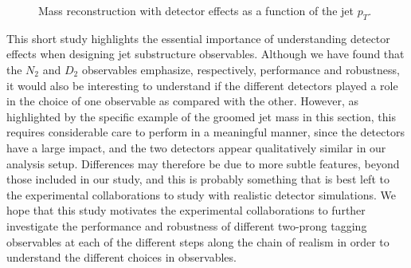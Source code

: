 \documentclass[11pt,letterpaper]{article}
\begin{document}
\begin{figure}
  \caption{Mass reconstruction with detector effects as a function of the jet $p_T$.}
  \label{fig:mass-detector}
\end{figure}




This short study highlights the essential importance of understanding detector effects when designing jet substructure observables. Although we have found that the $N_2$ and $D_2$ observables emphasize, respectively, performance and robustness, it would also be interesting to understand if the different detectors played a role in the choice of one observable as compared with the other. However, as highlighted by the specific example of the groomed jet mass in this section, this requires considerable care to perform in a meaningful manner, since the detectors have a large impact, and the two detectors appear qualitatively similar in our analysis setup. Differences may therefore be due to more subtle features, beyond those included in our study, and this is probably something that is best left to the experimental collaborations to study with realistic detector simulations. We hope that this study motivates the experimental collaborations to further investigate the performance and robustness of different two-prong tagging observables at each of the different steps along the chain of realism in order to understand the different choices in observables.
\end{document}
